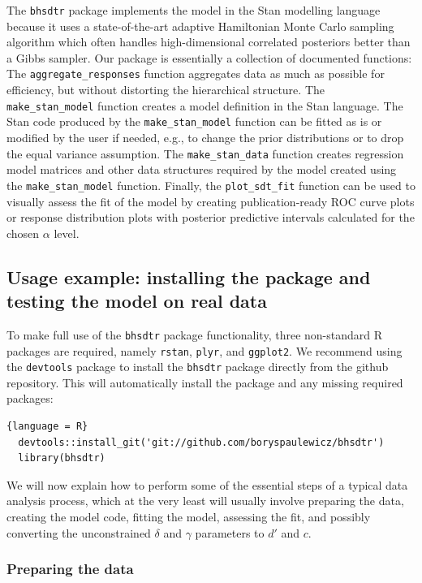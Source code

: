 \documentclass[a4paper,man,apacite,floatsintext]{apa6}
\newcommand{\code}[1]{\texttt{#1}}
\begin{document}
The \code{bhsdtr} package implements the model in the Stan modelling
language because it uses a state-of-the-art adaptive Hamiltonian Monte
Carlo sampling algorithm which often handles high-dimensional
correlated posteriors better than a Gibbs sampler. Our package is
essentially a collection of documented functions: The
\code{aggregate\_responses} function aggregates data as much as
possible for efficiency, but without distorting the hierarchical
structure. The \code{make\_stan\_model} function creates a model
definition in the Stan language. The Stan code produced by the
\code{make\_stan\_model} function can be fitted as is or modified by
the user if needed, e.g., to change the prior distributions or to drop
the equal variance assumption. The \code{make\_stan\_data} function
creates regression model matrices and other data structures required
by the model created using the \code{make\_stan\_model}
function. Finally, the \code{plot\_sdt\_fit} function can be used to
visually assess the fit of the model by creating publication-ready ROC
curve plots or response distribution plots with posterior predictive
intervals calculated for the chosen $\alpha$ level.

\subsection{Usage example: installing the package and testing the
  model on real data}

To make full use of the \code{bhsdtr} package functionality, three
non-standard R packages are required, namely \code{rstan},
\code{plyr}, and \code{ggplot2}. We recommend using the
\code{devtools} package to install the \code{bhsdtr} package directly
from the github repository. This will automatically install the
package and any missing required packages:

\begin{lstlisting}{language = R}
  devtools::install_git('git://github.com/boryspaulewicz/bhsdtr')
  library(bhsdtr)
\end{lstlisting}

We will now explain how to perform some of the essential steps of a
typical data analysis process, which at the very least will usually
involve preparing the data, creating the model code, fitting the
model, assessing the fit, and possibly converting the unconstrained
$\delta$ and $\gamma$ parameters to $d'$ and $c$.

\subsubsection{Preparing the data}
\end{document}
